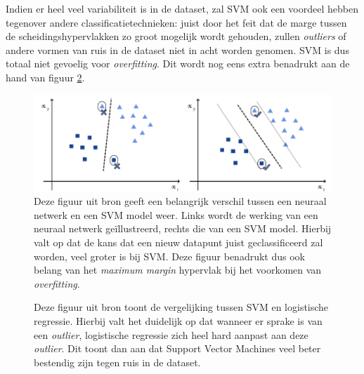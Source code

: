 \documentclass[twoside, kulak]{kulakreport}
\begin{document}
	Indien er heel veel variabiliteit is in de dataset, zal SVM ook een voordeel hebben tegenover andere classificatietechnieken: juist door het feit dat de marge tussen de scheidingshypervlakken zo groot mogelijk wordt gehouden, zullen \textit{outliers} of andere vormen van ruis in de dataset niet in acht worden genomen. SVM is dus totaal niet gevoelig voor \textit{overfitting}. Dit wordt nog eens extra benadrukt aan de hand van figuur \ref{fig:LogistischeRegressieVsSVM}.
	
		\begin{figure}
		\centering
		\includegraphics[width=.7\textwidth]{NeuralNets-vs-SVM}
		\caption{Deze figuur uit bron \cite{Luca_2022} geeft een belangrijk verschil tussen een neuraal netwerk en een SVM model weer. Links wordt de werking van een neuraal netwerk geïllustreerd, rechts die van een SVM model. Hierbij valt op dat de kans dat een nieuw datapunt juist geclassificeerd zal worden, veel groter is bij SVM. Deze figuur benadrukt dus ook belang van het \textit{maximum margin} hypervlak bij het voorkomen van \textit{overfitting}. }
		\label{fig:NeuralNetsVsSVM}
	\end{figure}
	
	\newpage
	
	\begin{figure}
		\centering
		\caption{Deze figuur uit bron \cite{Ramo_2017} toont de vergelijking tussen SVM en logistische regressie. Hierbij valt het duidelijk op dat wanneer er sprake is van een \textit{outlier}, logistische regressie zich heel hard aanpast aan deze \textit{outlier}. Dit toont dan aan dat Support Vector Machines veel beter bestendig zijn tegen ruis in de dataset. }
		\label{fig:LogistischeRegressieVsSVM}
	\end{figure}
	
\end{document}
